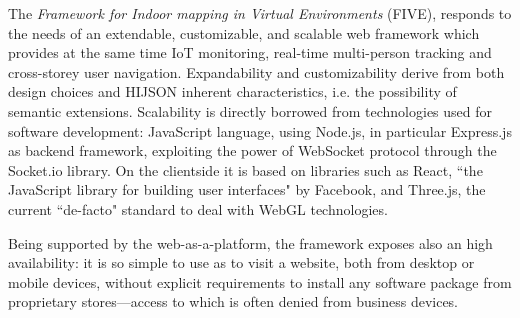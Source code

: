 \documentclass[]{egpubl}
\begin{document}
The \emph{Framework for Indoor mapping in Virtual Environments} (FIVE), responds to the needs of an extendable, customizable,
and scalable web framework which provides at the same time IoT monitoring,
real-time multi-person tracking and cross-storey user navigation.
Expandability and customizability derive from both design choices and HIJSON
inherent characteristics, i.e. the possibility of semantic extensions.
Scalability is directly borrowed from technologies used for software
development: JavaScript language, using Node.js, in particular Express.js as
backend framework, exploiting the power of WebSocket protocol through the
Socket.io library. On the clientside it is based on libraries such as React, ``the
JavaScript library for building user interfaces" by Facebook, and Three.js,
the current ``de-facto" standard to deal with WebGL technologies.

Being supported by the web-as-a-platform, the framework exposes also an high
availability: it is so simple to use as to visit a website, both from desktop
or mobile devices, without explicit requirements to install any software
package from proprietary stores---access to which is often denied from business
devices.

\end{document}
